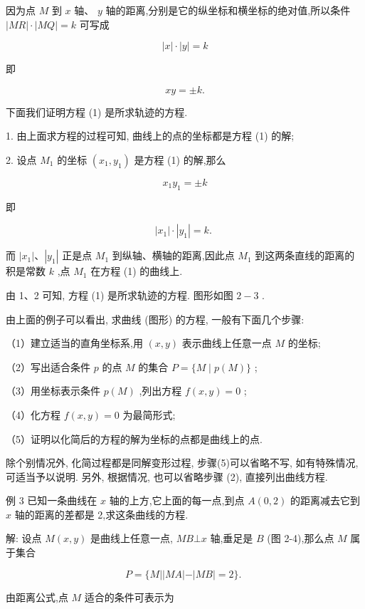 \documentclass[lang=cn,newtx,10pt,scheme=chinese]{elegantbook}
\begin{document}
因为点 \(M\) 到 \(x\) 轴、 \(y\) 轴的距离,分别是它的纵坐标和横坐标的绝对值,所以条件 \(\left| {MR}\right| \cdot \left| {MQ}\right| = k\) 可写成

\[
  \left| x\right| \cdot \left| y\right| = k
\]

即

\[
    {xy} = \pm k\text{.} \tag{1}
\]

下面我们证明方程 (1) 是所求轨迹的方程.

1. 由上面求方程的过程可知, 曲线上的点的坐标都是方程 (1) 的解;

2. 设点 \({M}_{1}\) 的坐标 \(\left( {{x}_{1},{y}_{1}}\right)\) 是方程 (1) 的解,那么

\[
    {x}_{1}{y}_{1} = \pm k
\]

即

\[
  \left| {x}_{1}\right| \cdot \left| {y}_{1}\right| = k\text{. }
\]

而 \(\left| {x}_{1}\right| \text{、}\left| {y}_{1}\right|\) 正是点 \({M}_{1}\) 到纵轴、横轴的距离,因此点 \({M}_{1}\) 到这两条直线的距离的积是常数 \(k\) ,点 \({M}_{1}\) 在方程 (1) 的曲线上.

由 1、2 可知, 方程 (1) 是所求轨迹的方程. 图形如图 \(2 - 3\) .

由上面的例子可以看出, 求曲线 (图形) 的方程, 一般有下面几个步骤:

（1）建立适当的直角坐标系,用 \(\left( {x,y}\right)\) 表示曲线上任意一点 \(M\) 的坐标;

（2）写出适合条件 \(p\) 的点 \(M\) 的集合 \(P = \{ M \mid p\left( M\right) \}\) ;

（3）用坐标表示条件 \(p\left( M\right)\) ,列出方程 \(f\left( {x,y}\right) = 0\) ;

（4）化方程 \(f\left( {x,y}\right) = 0\) 为最简形式;

（5）证明以化简后的方程的解为坐标的点都是曲线上的点.

除个别情况外, 化简过程都是同解变形过程, 步骤(5)可以省略不写, 如有特殊情况, 可适当予以说明. 另外, 根据情况, 也可以省略步骤 (2), 直接列出曲线方程.

例 3 已知一条曲线在 \(x\) 轴的上方,它上面的每一点,到点 \(A\left( {0,2}\right)\) 的距离减去它到 \(x\) 轴的距离的差都是 2,求这条曲线的方程.

解: 设点 \(M\left( {x,y}\right)\) 是曲线上任意一点, \({MB} \bot x\) 轴,垂足是 \(B\) (图 2-4),那么点 \(M\) 属于集合

\[
  P = \{ M\left| \right| {MA}\left| -\right| {MB} \mid = 2\} \text{. }
\]

由距离公式,点 \(M\) 适合的条件可表示为
\end{document}
